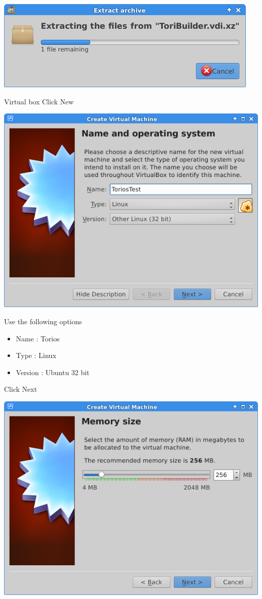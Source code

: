 \documentclass[12pt,a4paper]{book}
\begin{document}
\begin{center}
\includegraphics[width=0.7\linewidth]{extractVBimage}
\end{center}

Virtual box 
Click New

\begin{center}
\item \includegraphics[width=0.7\linewidth]{ToriosTest01}
\end{center}

Use the following options
\begin{itemize}
\item Name : Torios
\item Type : Linux
\item Version : Ubuntu 32 bit
\end{itemize}

Click Next

\begin{center}
\includegraphics[width=0.7\linewidth]{ToriosTest02}
\end{center}
\end{document}
